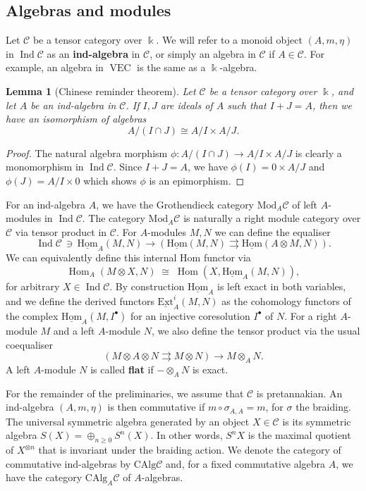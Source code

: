 \documentclass[11pt]{amsart}
\def\Ind{\operatorname{Ind}}
\def\Hom{\operatorname{Hom}}
\newcommand{\uHom}{\underline{\mathrm{Hom}}}
\def\Cs{\mathscr{C}}
\def\cC{\mathscr{C}}
\def\bk{\Bbbk}
\def\VEC{\operatorname{VEC}}
\def\Ext{\mathrm{Ext}}
\def\Mod{\mathrm{Mod}}
\newtheorem{lemma}[thm]{Lemma}
\theoremstyle{definition}
\theoremstyle{remark}
\numberwithin{equation}{section}
\newcommand{\uExt}{\underline{\Ext}}
\newcommand{\CAlg}{\mathrm{CAlg}}
\begin{document}
\subsection{ Algebras and modules}\label{sec:comalg1}

Let $\cC$ be a tensor category over $\bk$. We will refer to a monoid object $(A,m,\eta)$ in $\Ind\cC$ as an {\bf ind-algebra} in $\cC$, or simply an algebra in $\cC$ if $A\in\cC$. For example, an algebra in $\VEC$ is the same as a $\Bbbk$-algebra.


\begin{lemma}[Chinese reminder theorem]\label{lemma CRT}
    Let $\mathscr{C}$ be a tensor category over $\Bbbk$, and let $A$ be an ind-algebra in $\mathscr{C}$.  If $I,J$ are ideals of $A$ such that $I+J=A$, then we have an isomorphism of algebras
    \[
    A/(I\cap J)\cong A/I\times A/J.
    \]
\end{lemma}
\begin{proof}
    The natural algebra morphism $\phi:A/(I\cap J)\to A/I\times A/J$ is clearly a monomorphism in $\Ind\cC$.  Since $I+J=A$, we have $\phi(I)=0\times A/J$ and $\phi(J)=A/I\times 0$ which shows $\phi$ is an epimorphism.
\end{proof}


For an ind-algebra $A$, we have the Grothendieck category $\Mod_A\Cs$ of left $A$-modules in $\Ind\cC$.  The category $\Mod_{A}\Cs$ is naturally a right module category over $\Cs$ via tensor product in $\Cs$.  For $A$-modules $M,N$ we can define the equaliser
\[\Ind\cC\,\ni\,\uHom_A(M,N)\to\left(\uHom(M,N)\rightrightarrows \uHom(A\otimes M,N)\right).\]
We can equivalently define this internal Hom functor via
\[
\Hom_A(M\otimes X,N)\;\cong\;\Hom(X,\uHom_A(M,N)),
\]
for arbitrary $X\in\Ind\cC$.
By construction $\uHom_A$ is left exact in both variables, and we define the derived functors $\uExt^i_A(M,N)$ as the cohomology functors of the complex $\uHom_A(M,I^\bullet)$ for an injective coresolution $I^\bullet$ of $N$. For a right $A$-module $M$ and a left $A$-module $N$, we also define the tensor product via the usual coequaliser
\[\left(M\otimes A\otimes N\rightrightarrows M\otimes N\right)\to M\otimes_A N.\]
A left $A$-module $N$ is called {\bf flat} if $-\otimes_AN$ is exact.


For the remainder of the preliminaries, we assume that $\cC$ is pretannakian. An ind-algebra $(A,m,\eta)$ is then commutative if $m\circ\sigma_{A,A}=m$, for $\sigma$ the braiding. The universal symmetric algebra generated by an object $X\in\cC$ is its symmetric algebra $S(X)=\oplus_{n\ge 0}S^n(X)$. In other words, $S^n X$ is the maximal quotient of $X^{\otimes n}$ that is invariant under the braiding action. We denote the category of commutative ind-algebras by $\CAlg\cC$ and, for a fixed commutative algebra $A$, we have the category $\CAlg_A\cC$ of $A$-algebras. %
\end{document}
